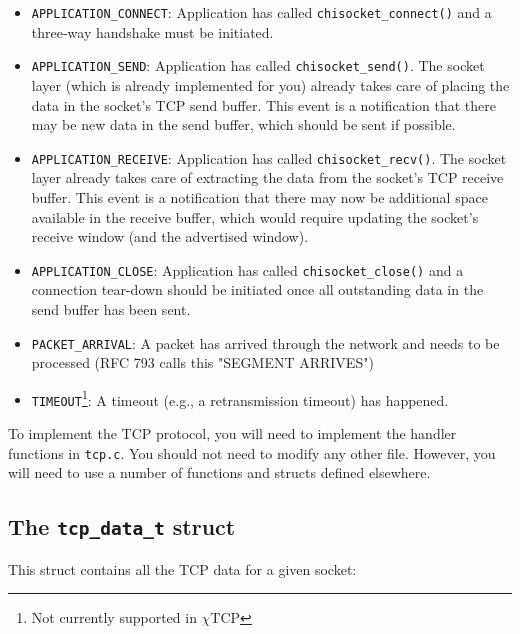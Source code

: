 \documentclass[10pt]{article}
\newcommand{\chitcp}{$\chi$\textsf{TCP} }
\begin{document}
\begin{itemize}
\begin{itemize}
\item \texttt{APPLICATION\_CONNECT}: Application has called \texttt{chisocket\_connect()} and a three-way handshake must be initiated.
\item \texttt{APPLICATION\_SEND}: Application has called \texttt{chisocket\_send()}. The socket layer (which is already implemented for you) already takes care of placing the data in the socket's TCP send buffer. This event is a notification that there may be new data in the send buffer, which should be sent if possible.
\item \texttt{APPLICATION\_RECEIVE}: Application has called \texttt{chisocket\_recv()}. The socket layer already takes care of extracting the data from the socket's TCP receive buffer. This event is a notification that there may now be additional space available in the receive buffer, which would require updating the socket's receive window (and the advertised window).
\item \texttt{APPLICATION\_CLOSE}: Application has called \texttt{chisocket\_close()} and a connection tear-down should be initiated once all outstanding data in the send buffer has been sent.
\item \texttt{PACKET\_ARRIVAL}: A packet has arrived through the network and needs to be processed (RFC 793 calls this "SEGMENT ARRIVES")
\item \texttt{TIMEOUT}\footnote{Not currently supported in \chitcp}: A timeout (e.g., a retransmission timeout) has happened.
\end{itemize}
\end{itemize}

To implement the TCP protocol, you will need to implement the handler functions in \texttt{tcp.c}. You should not need to modify any other file. However, you will need to use a number of functions and structs defined elsewhere.

\subsection{The \texttt{tcp\_data\_t} struct}

This struct contains all the TCP data for a given socket:
\end{document}
